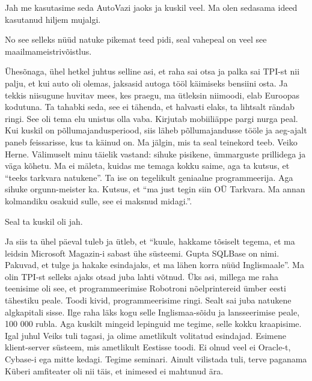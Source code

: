 Jah me kasutasime seda AutoVazi jaoks ja  kuskil veel. Ma olen sedasama ideed 
kasutanud hiljem mujalgi.


No see selleks nüüd natuke pikemat teed pidi, seal vahepeal on veel see 
maailmameistrivõistlus. 

Ühesõnaga, ühel hetkel juhtus selline asi, et raha sai otsa ja palka sai 
TPI-st nii palju, et kui auto oli olemas, 
jaksasid autoga tööl käimiseks bensiini osta. Ja tekkis niisugune huvitav mees, 
kes praegu, ma ütleksin niimoodi, elab Euroopas kodutuna. Ta tahabki seda, see 
ei tähenda, et halvasti elaks, ta lihtsalt rändab ringi. See oli tema elu 
unistus olla vaba. Kirjutab mobiiliäppe pargi nurga peal. Kui kuskil on 
põllumajandusperiood, siis läheb põllumajandusse tööle ja aeg-ajalt paneb 
feissarisse, kus ta käinud on. Ma jälgin, mis ta seal teinekord teeb. Veiko 
Herne. Välimuselt minu täielik vastand: sihuke 
pisikene, ümmarguste prillidega ja väga kõhetu. Ma ei mäleta, kuidas me temaga 
kokku saime, aga ta kutsus, et \enquote{teeks tarkvara natukene}. Ta ise on 
tegelikult geniaalne programmeerija. Aga sihuke orgunn-meister ka. Kutsus, et 
\enquote{ma just tegin siin OÜ Tarkvara. Ma annan kolmandiku osakuid sulle, see 
ei maksnud midagi.}.


Seal ta kuskil oli jah.

Ja siis ta ühel päeval tuleb ja ütleb, et \enquote{kuule, hakkame tõsiselt 
tegema, et ma  leidsin Microsoft Magazin-i sabast ühe süsteemi. 
Gupta SQLBase on nimi. 
Pakuvad, et tulge ja hakake esindajaks, et ma lähen korra nüüd Inglismaale}. Ma 
olin TPI-st selleks ajaks  otsad juba lahti võtnud. Üks asi, millega me raha 
teenisime oli see, et programmeerimise Robotroni nõelprintereid ümber eesti 
tähestiku peale. Toodi kivid, programmeerisime ringi. Sealt sai juba natukene 
algkapitali sisse. Ilge raha läks kogu selle Inglismaa-sõidu ja lansseerimise 
peale, 100 000 rubla. Aga kuskilt mingeid lepinguid me tegime, selle kokku 
kraapisime. Igal juhul Veiks tuli tagasi, ja olime ametlikult volitatud 
esindajad. Esimene klient-server süsteem, mis  ametlikult Eestisse toodi. Ei 
olnud veel ei Oracle-t, Cybase-i ega mitte kedagi. Tegime seminari. Ainult 
vilistada tuli, terve paganama Küberi amfiteater oli nii täis, et inimesed ei 
mahtunud ära. 

